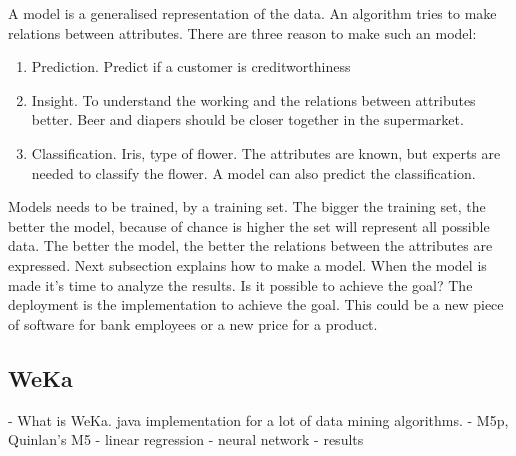 	A model is a generalised representation of the data. An algorithm tries to make relations between attributes. There are three reason to make such an model:
	\begin{enumerate}
		\item Prediction. Predict if a customer is creditworthiness 
		\item Insight. To understand the working and the relations between attributes better. Beer and diapers should be closer together in the supermarket.
		\item Classification. Iris, type of flower. The attributes are known, but experts are needed to classify the flower. A model can also predict the classification.
	\end{enumerate}
	Models needs to be trained, by a training set. The bigger the training set, the better the model, because of chance is higher the set will represent all possible data. The better the model, the better the relations between the attributes are expressed. Next subsection explains how to make a model. When the model is made it's time to analyze the results. Is it possible to achieve the goal? The deployment is the implementation to achieve the goal. This could be a new piece of software for bank employees or a new price for a product. 

	\subsection{WeKa}
	- What is WeKa. java implementation for a lot of data mining algorithms.
	- M5p, Quinlan's M5
	- linear regression
	- neural network
	- results 

